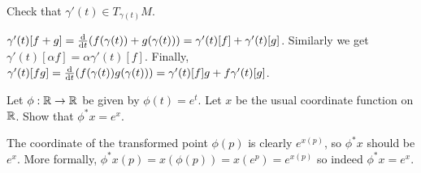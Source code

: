 \begin{p}
{Check that $\gamma'(t)\in T_{\gamma(t)}M$.}
\end{p}

$\gamma'(t)[f+g]=\frac{\rm d}{{\rm d}t}(f(\gamma(t))+g(\gamma(t)))=\gamma'(t)[f]+\gamma'(t)[g]$. Similarly
we get $\gamma'(t)[\alpha f]=\alpha \gamma'(t)[f]$. Finally, $\gamma'(t)[fg]=\frac{\rm d}{{\rm d}t}
(f(\gamma(t))g(\gamma(t)))=\gamma'(t)[f]g+f\gamma'(t)[g]$.

\begin{p}
Let $\phi: \mathbb{R}\rightarrow \mathbb{R}$ be given by $\phi(t)=e^t$. Let
$x$ be the usual coordinate function on $\mathbb{R}$. Show that $\phi^*x=e^x$.
\end{p}

The coordinate of the transformed point $\phi(p)$ is clearly $e^{x(p)}$, so $\phi^*x$ should be $e^x$. More
formally, $\phi^*x(p)=x(\phi(p))=x(e^{p})=e^{x(p)}$ so indeed $\phi^*x=e^x$.

